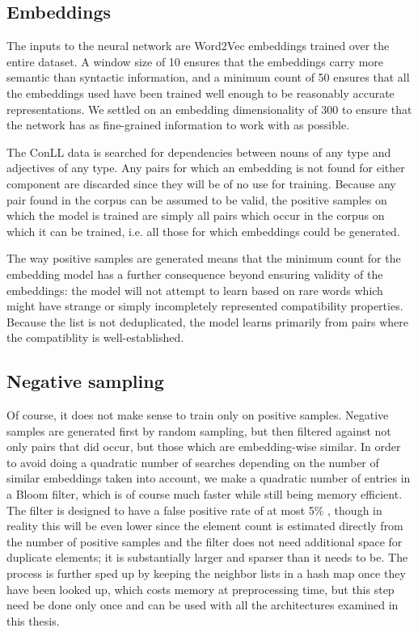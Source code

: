 \documentclass[a4paper, 12pt]{article}
\begin{document}
\subsection{Embeddings}

The inputs to the neural network are Word2Vec embeddings trained over the entire dataset. A window size of 10 ensures that the embeddings carry more semantic than syntactic information, and a minimum count of 50 ensures that all the embeddings used have been trained well enough to be reasonably accurate representations. We settled on an embedding dimensionality of 300 to ensure that the network has as fine-grained information to work with as possible.

The ConLL data is searched for dependencies between nouns of any type and adjectives of any type. Any pairs for which an embedding is not found for either component are discarded since they will be of no use for training. Because any pair found in the corpus can be assumed to be valid, the positive samples on which the model is trained are simply all pairs which occur in the corpus on which it can be trained, i.e. all those for which embeddings could be generated.

The way positive samples are generated means that the minimum count for the embedding model has a further consequence beyond ensuring validity of the embeddings: the model will not attempt to learn based on rare words which might have strange or simply incompletely represented compatibility properties. Because the list is not deduplicated, the model learns primarily from pairs where the compatiblity is well-established.

\subsection{Negative sampling}

Of course, it does not make sense to train only on positive samples. Negative samples are generated first by random sampling, but then filtered against not only pairs that did occur, but those which are embedding-wise similar. In order to avoid doing a quadratic number of searches depending on the number of similar embeddings taken into account, we make a quadratic number of entries in a Bloom filter, which is of course much faster while still being memory efficient. The filter is designed to have a false positive rate of at most 5\% , though in reality this will be even lower since the element count is estimated directly from the number of positive samples and the filter does not need additional space for duplicate elements; it is substantially larger and sparser than it needs to be. The process is further sped up by keeping the neighbor lists in a hash map once they have been looked up, which costs memory at preprocessing time, but this step need be done only once and can be used with all the architectures examined in this thesis.
\end{document}
